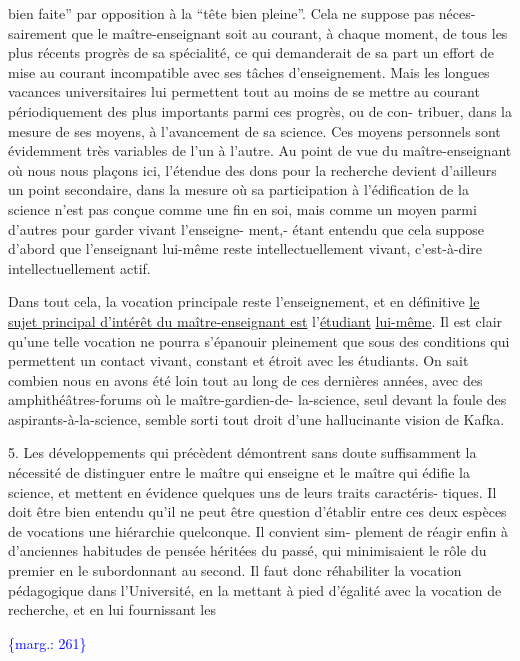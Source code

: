\documentclass[11pt]{article}
\newcommand{\scanpage}[1]{\par\bigskip\noindent{\small\sffamily[scan #1]}\par}
\newcommand{\mspage}[1]{{\small\sffamily[p.\,#1]}}
\newcommand{\margin}[1]{\textcolor{blue}{\{\textsf{marg.:} #1\}}}
\newcommand{\uline}[1]{\underline{#1}}
\begin{document}
bien faite'' par opposition à la ``tête bien pleine''. Cela ne suppose pas néces-%
sairement que le maître-enseignant soit au courant, à chaque moment, de tous
les plus récents progrès de sa spécialité, ce qui demanderait de sa part un
effort de mise au courant incompatible avec ses tâches d'enseignement. Mais
les longues vacances universitaires lui permettent tout au moins de se mettre
au courant périodiquement des plus importants parmi ces progrès, ou de con-%
tribuer, dans la mesure de ses moyens, à l'avancement de sa science. Ces
moyens personnels sont évidemment très variables de l'un à l'autre. Au point
de vue du maître-enseignant où nous nous plaçons ici, l'étendue des dons pour
la recherche devient d'ailleurs un point secondaire, dans la mesure où sa
participation à l'édification de la science n'est pas conçue comme une fin
en soi, mais comme un moyen parmi d'autres pour garder vivant l'enseigne-%
ment,- étant entendu que cela suppose d'abord que l'enseignant lui-même reste
intellectuellement vivant, c'est-à-dire intellectuellement actif.

Dans tout cela, la vocation principale reste l'enseignement, et en
définitive \uline{le sujet principal d'intérêt du maître-enseignant est} l'\uline{étudiant}
\uline{lui-même}. Il est clair qu'une telle vocation ne pourra s'épanouir pleinement
que sous des conditions qui permettent un contact vivant, constant et étroit
avec les étudiants. On sait combien nous en avons été loin tout au long de
ces dernières années, avec des amphithéâtres-forums où le maître-gardien-de-%
la-science, seul devant la foule des aspirants-à-la-science, semble sorti
tout droit d'une hallucinante vision de Kafka.

5. Les développements qui précèdent démontrent sans doute suffisamment la
nécessité de distinguer  entre le maître qui enseigne et le maître qui édifie
la science, et mettent en évidence quelques uns de leurs traits caractéris-%
tiques. Il doit être bien entendu qu'il ne peut être question d'établir entre
ces deux espèces de vocations une hiérarchie quelconque. Il convient sim-%
plement de réagir enfin à d'anciennes habitudes de pensée héritées du passé,
qui minimisaient le rôle du premier en le subordonnant au second. Il faut
donc réhabiliter la vocation pédagogique dans l'Université, en la mettant
à pied d'égalité avec la vocation de recherche, et en lui fournissant les

\margin{261}

\clearpage
\scanpage{119/262}
\mspage{9}
\end{document}
